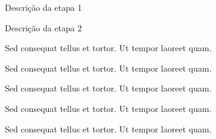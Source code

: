 \begin{etapas}
	\item \label{e1} Descrição da etapa 1
	\item \label{e2} Descrição da etapa 2
	\item \label{e3} Sed consequat tellus et tortor. Ut tempor laoreet quam. 
	\item \label{e4} Sed consequat tellus et tortor. Ut tempor laoreet quam. 
	\item \label{e5} Sed consequat tellus et tortor. Ut tempor laoreet quam. 
	\item \label{e6} Sed consequat tellus et tortor. Ut tempor laoreet quam. 
	\item \label{e7} Sed consequat tellus et tortor. Ut tempor laoreet quam. 
\end{etapas}

\begin{center}

\begin{ganttchart}{1}{24}
 \\ %
     \\ %
         \\
         \\
         \\
\end{ganttchart}

\begin{ganttchart}{1}{12}
\\ %
     \\ %
         \\
         \\
\end{ganttchart}

\end{center}